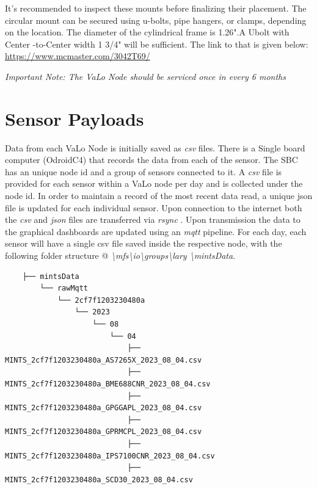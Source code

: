 \documentclass[12pt]{article}
\begin{document}
\begin{itemize}
\begin{enumerate}
        It's recommended to inspect these mounts before finalizing their placement. The circular mount can be secured using u-bolts, pipe hangers, or clamps, depending on the location. The diameter of the cylindrical frame is 1.26".A Ubolt with Center -to-Center width 1 3/4" will be sufficient. The link to that is given below: \url{https://www.mcmaster.com/3042T69/}
 \end{enumerate}

\end{itemize}





\textit{Important Note: The VaLo Node should be serviced once in every 6 months}


\section{Sensor Payloads}\label{sec:sensorPayloads}
 Data from each VaLo  Node is initially saved as \emph{csv} files. There is a Single board computer (OdroidC4) that records the data from each of the sensor. The SBC has an unique node id and a group of sensors connected to it. A \emph{csv} file is provided for each sensor within a VaLo node per day and is collected under the  node id. In order to maintain a record of the most recent data read, a unique json file is updated for each individual sensor. Upon connection to the internet both the \emph{csv} and \emph{json} files are transferred via \emph{rsync} \cite{tridgell1996rsync}. Upon transmission the data to the graphical dashboards are updated using an \emph{mqtt} \cite{Light2017} pipeline. For each day, each sensor will have a single csv file saved inside the respective node, with the following folder structure @ \emph{\textbackslash mfs\textbackslash io\textbackslash groups\textbackslash lary \textbackslash mintsData}.

 
  \begin{verbatim}
    ├── mintsData
        └── rawMqtt
            └── 2cf7f1203230480a
                └── 2023
                    └── 08
                        └── 04
                            ├── MINTS_2cf7f1203230480a_AS7265X_2023_08_04.csv
                            ├── MINTS_2cf7f1203230480a_BME688CNR_2023_08_04.csv
                            ├── MINTS_2cf7f1203230480a_GPGGAPL_2023_08_04.csv
                            ├── MINTS_2cf7f1203230480a_GPRMCPL_2023_08_04.csv
                            ├── MINTS_2cf7f1203230480a_IPS7100CNR_2023_08_04.csv
                            ├── MINTS_2cf7f1203230480a_SCD30_2023_08_04.csv
    \end{verbatim}  
    
\end{document}
